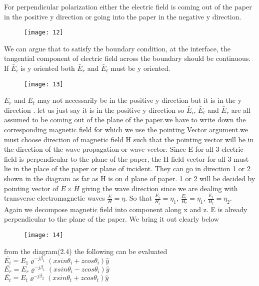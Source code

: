 For perpendicular  polarization  either the electric field is coming out of the paper in the positive y direction or going into the paper in the negative  y direction.\\
\begin{figure}[h]
	\centering
	\texttt{[image: 12]}
	\caption{}
\end{figure}
 We can argue that to satisfy the boundary condition, at the interface, the tangential component  of electric field across the boundary should be continuous. If $\bar{E}_{i}$ is y oriented both  $\bar{E}_{r}$ and  $\bar{E}_{t}$ must be y oriented.\\
\begin{figure}[h]
	\centering
	\texttt{[image: 13]}
	\caption{}
\end{figure}
 $\bar{E}_{r}$ and  $\bar{E}_{t}$ may not necessarily be in the positive y direction but it is in the y direction . let us just say it is in the positive  y direction so  $\bar{E}_{i}$,  $\bar{E}_{t}$ and  $\bar{E}_{r}$ are all assumed to be coming out of the plane of the paper.we have to write down the corresponding  magnetic field for which we use the pointing Vector argument.we must choose direction of magnetic  field H such that the pointing vector will be in the direction of the wave propagation or wave vector. Since E for all 3 electric field is perpendicular  to the plane of the paper, the H field vector for all 3 must lie in the place of the paper or plane of incident. They can go in direction 1 or 2 shown in the diagram as far as H is on d plane of paper. 1 or 2 will be decided by pointing vector of  $\bar{E} \times \bar{H}$ giving the wave direction since we are dealing with transverse  electromagnetic  waves $\frac{E}{H} = \eta$. So that $\frac{E_{i}}{H_{i}} = \eta_{1}$, $\frac{E_{r}}{H_{r}} = \eta_{1}$, $\frac{E_{t}}{H_{t}} = \eta_{2}$.\\
Again we decompose magnetic  field into component along x and z. E is already perpendicular to the plane of the paper. We bring it out clearly below\\
\begin{figure}[h]
	\centering
	\texttt{[image: 14]}
	\caption{}
\end{figure}

\begin{center}
	from the diagram(2.4) the following can be evaluated\\
	$ \bar{E_{i}} = E_{1} \varrho^{-j\beta_{1}} (x sin\theta_{i} + z cos\theta_{i}) \hat{y}$\\
	
	
	$ \bar{E_{r}} = E_{r}  \varrho^{-j\beta_{1}} (x sin\theta_{i} - z cos\theta_{i}) \hat{y}$\\
	
	
	$ \bar{E_{t}} = E_{t} \varrho^{-j\beta_{2}} (x sin\theta_{t} + z cos\theta_{t}) \hat{y}$
\end{center}


